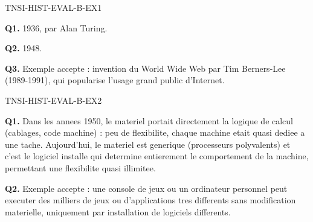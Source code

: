 \begin{corrige}{TNSI-HIST-EVAL-B-EX1}

\textbf{Q1.} 1936, par Alan Turing.

\textbf{Q2.} 1948.

\textbf{Q3.} Exemple accepte : invention du World Wide Web par Tim Berners-Lee (1989-1991), qui popularise l'usage grand public d'Internet.

\end{corrige}

\begin{corrige}{TNSI-HIST-EVAL-B-EX2}

\textbf{Q1.} Dans les annees 1950, le materiel portait directement la logique de calcul (cablages, code machine) : peu de flexibilite, chaque machine etait quasi dediee a une tache. Aujourd'hui, le materiel est generique (processeurs polyvalents) et c'est le logiciel installe qui determine entierement le comportement de la machine, permettant une flexibilite quasi illimitee.

\textbf{Q2.} Exemple accepte : une console de jeux ou un ordinateur personnel peut executer des milliers de jeux ou d'applications tres differents sans modification materielle, uniquement par installation de logiciels differents.

\end{corrige}
